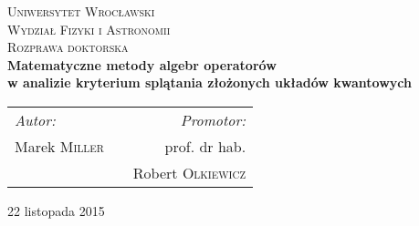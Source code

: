\begin{titlepage}

\begin{center}

\textsc{\LARGE Uniwersytet Wrocławski}\\[0.5cm]
\textsc{\Large Wydział Fizyki i Astronomii} \\[1.5cm]
\textsc{\Large Rozprawa doktorska} \\[2cm]

{ \Large \bfseries
    Matematyczne metody algebr operatorów\\
    w analizie kryterium splątania
    złożonych układów kwantowych
}\\[3cm]

{ \large
\begin{center}
\begin{tabular}{lcr}
\emph{Autor:} & \hspace{3cm} & \emph{Promotor:}\\
Marek \textsc{Miller} & & prof. dr hab. \\
    & & Robert \textsc{Olkiewicz}
\end{tabular}
\end{center}
}

\vfill


{\large 22 listopada 2015}
\end{center}

\end{titlepage}
